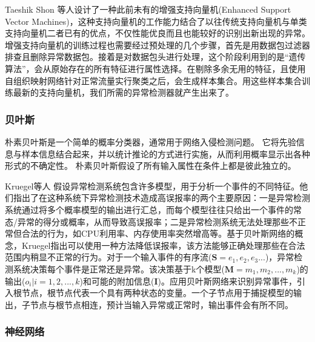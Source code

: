 
Taeshik Shon 等人\cite{shon2005machine}设计了一种此前未有的增强支持向量机(Enhanced Support Vector Machines)，这种支持向量机的工作能力结合了以往传统支持向量机与单类支持向量机二者已有的优点，不仅性能优良而且也能较好的识别出新出现的异常。增强支持向量机的训练过程也需要经过预处理的几个步骤，首先是用数据包过滤器排查且删除异常数据包。接着是对数据包头进行处理，这个阶段利用到的是“遗传算法”，会从原始存在的所有特征进行属性选择。在剔除多余无用的特征，且使用自组织映射网络针对正常流量实行聚类之后，会生成样本集合。用这些样本集合训练最新的支持向量机，我们所需的异常检测器就产生出来了。


\subsubsection{贝叶斯}

朴素贝叶斯是一个简单的概率分类器，通常用于网络入侵检测问题。 它将先验信息与样本信息结合起来，并以统计推论的方式进行实施，从而利用概率显示出各种形式的不确定性。 朴素贝叶斯假设了所有输入属性在条件上都是彼此独立的。

Kruegel等人\cite{kruegel2003bayesian} 假设异常检测系统包含许多模型，用于分析一个事件的不同特征。他们指出了在这种系统下异常检测技术造成高误报率的两个主要原因：一是异常检测系统通过将多个概率模型的输出进行汇总，而每个模型往往只给出一个事件的常态/异常的得分或概率，从而导致高误报率；二是异常检测系统无法处理那些不正常但合法的行为，如CPU利用率、内存使用率突然增高等。基于贝叶斯网络的概念，Kruegel\citep{kruegel2003bayesian}指出可以使用一种方法降低误报率，该方法能够正确处理那些在合法范围内稍显不正常的行为。对于一个输入事件的有序流($\symbf{S}=e_1,e_2,e_3...$)，异常检测系统决策每个事件是正常还是异常。该决策基于k个模型($\symbf{M}=m_1,m_2,...,m_k$)的输出($o_i|i=1,2,...,k$)和可能的附加信息($\symbf{I}$)。应用贝叶斯网络来识别异常事件，引入根节点，根节点代表一个具有两种状态的变量。一个子节点用于捕捉模型的输出，子节点与根节点相连，预计当输入异常或正常时，输出事件会有所不同。

\subsubsection{神经网络}

